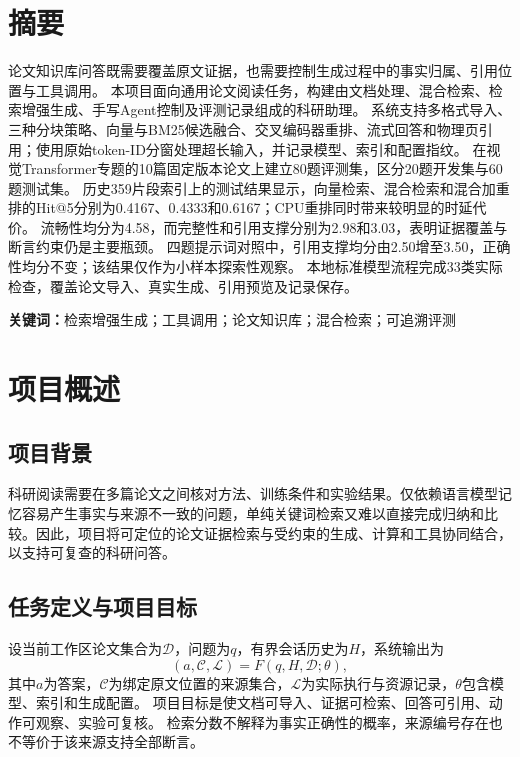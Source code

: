 \documentclass[UTF8,a4paper,zihao=-4,fontset=fandol]{ctexart}
\begin{document}
\hypersetup{pageanchor=true}
\section*{摘要}
论文知识库问答既需要覆盖原文证据，也需要控制生成过程中的事实归属、引用位置与工具调用。
本项目面向通用论文阅读任务，构建由文档处理、混合检索、检索增强生成、手写Agent控制及评测记录组成的科研助理。
系统支持多格式导入、三种分块策略、向量与BM25候选融合、交叉编码器重排、流式回答和物理页引用；使用原始token-ID分窗处理超长输入，并记录模型、索引和配置指纹。
在视觉Transformer专题的10篇固定版本论文上建立80题评测集，区分20题开发集与60题测试集。
历史359片段索引上的测试结果显示，向量检索、混合检索和混合加重排的Hit@5分别为0.4167、0.4333和0.6167；CPU重排同时带来较明显的时延代价。
流畅性均分为4.58，而完整性和引用支撑分别为2.98和3.03，表明证据覆盖与断言约束仍是主要瓶颈。
四题提示词对照中，引用支撑均分由2.50增至3.50，正确性均分不变；该结果仅作为小样本探索性观察。
本地标准模型流程完成33类实际检查，覆盖论文导入、真实生成、引用预览及记录保存。
\par\noindent\textbf{关键词：}检索增强生成；工具调用；论文知识库；混合检索；可追溯评测
\clearpage

\tableofcontents
\clearpage

\section{项目概述}
\subsection{项目背景}
科研阅读需要在多篇论文之间核对方法、训练条件和实验结果。仅依赖语言模型记忆容易产生事实与来源不一致的问题，单纯关键词检索又难以直接完成归纳和比较。因此，项目将可定位的论文证据检索与受约束的生成、计算和工具协同结合，以支持可复查的科研问答。

\subsection{任务定义与项目目标}
设当前工作区论文集合为$\mathcal D$，问题为$q$，有界会话历史为$H$，系统输出为
\begin{equation}
 (a,\mathcal C,\mathcal L)=F(q,H,\mathcal D;\theta),
\end{equation}
其中$a$为答案，$\mathcal C$为绑定原文位置的来源集合，$\mathcal L$为实际执行与资源记录，$\theta$包含模型、索引和生成配置。
项目目标是使文档可导入、证据可检索、回答可引用、动作可观察、实验可复核。
检索分数不解释为事实正确性的概率，来源编号存在也不等价于该来源支持全部断言。
\end{document}
